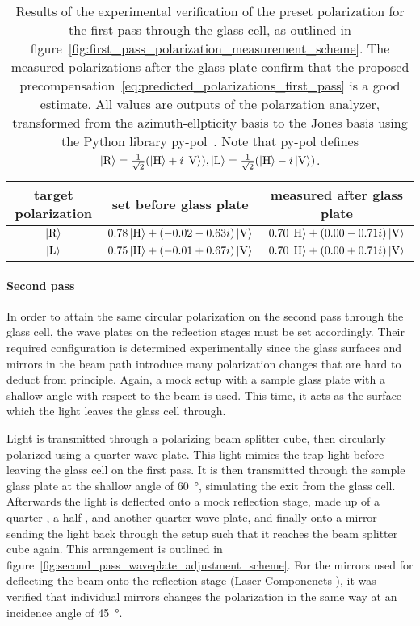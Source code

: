 \begin{table}
    \centering

    \begin{tabular}{ccc}
        \toprule
        target polarization & set before glass plate & measured after glass plate \\
        \midrule
        $\Ket{\text{R}}$ & $0.78 \Ket{\text{H}} + (-0.02-0.63i) \Ket{\text{V}}$ & $0.70 \Ket{\text{H}} +(0.00-0.71i)\Ket{\text{V}}$ \\
        $\Ket{\text{L}}$ & $0.75 \Ket{\text{H}} + (-0.01+0.67i)\Ket{\text{V}}$ & $0.70 \Ket{\text{H}} + (0.00+0.71i)\Ket{\text{V}}$ \\
        \bottomrule
    \end{tabular}
    \caption{Results of the experimental verification of the preset polarization for the first pass through the glass cell, as outlined in figure~\ref{fig:first_pass_polarization_measurement_scheme}. The measured polarizations after the glass plate confirm that the proposed precompensation~\eqref{eq:predicted_polarizations_first_pass} is a good estimate. All values are outputs of the polarzation analyzer, transformed from the azimuth-ellpticity basis to the Jones basis using the Python library py-pol~\cite{noauthor_python_nodate}. Note that py-pol defines $\Ket{\text{R}} = \frac{1}{\sqrt{2}}(\Ket{\text{H}}+i\Ket{\text{V}}), \Ket{\text{L}} = \frac{1}{\sqrt{2}}(\Ket{\text{H}}-i\Ket{\text{V}})$.}
        \label{tab:polarization_first_pass}
\end{table}

\paragraph{Second pass}
In order to attain the same circular polarization on the second pass through the glass cell, the wave plates on the reflection stages must be set accordingly. Their required configuration is determined experimentally since the glass surfaces and mirrors in the beam path introduce many polarization changes that are hard to deduct from principle. Again, a mock setup with a sample glass plate with a shallow angle with respect to the beam is used. This time, it acts as the surface which the light leaves the glass cell through.

Light is transmitted through a polarizing beam splitter cube, then circularly polarized using a quarter-wave plate. This light mimics the trap light before leaving the glass cell on the first pass. It is then transmitted through the sample glass plate at the shallow angle of \SI{60}{\degree}, simulating the exit from the glass cell. Afterwards the light is deflected onto a mock reflection stage, made up of a quarter-, a half-, and another quarter-wave plate, and finally onto a mirror sending the light back through the setup such that it reaches the beam splitter cube again. This arrangement is outlined in figure~\ref{fig:second_pass_waveplate_adjustment_scheme}. For the mirrors used for deflecting the beam onto the reflection stage (Laser Componenets ), it was verified that individual mirrors changes the polarization in the same way at an incidence angle of \SI{45}{\degree}.

